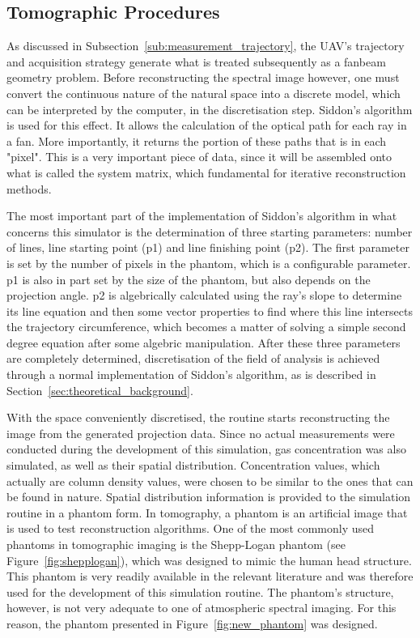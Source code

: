 \subsection{Tomographic Procedures}%
\label{sub:tomographic_procedures}

As discussed in Subsection~\ref{sub:measurement_trajectory}, the UAV's
trajectory and acquisition strategy generate what is treated
subsequently as a fanbeam geometry problem. Before reconstructing the
spectral image however, one must convert the continuous nature of the
natural space into a discrete model, which can be interpreted by the
computer, in the discretisation step. Siddon's algorithm is used for
this effect. It allows the calculation of the optical path for each ray
in a fan. More importantly, it returns the portion of these paths that
is in each "pixel". This is a very important piece of data, since it
will be assembled onto what is called the system matrix, which
fundamental for iterative reconstruction methods.

The most important part of the implementation of Siddon's algorithm in
what concerns this simulator is the determination of three starting
parameters: number of lines, line starting point (p1) and line finishing
point (p2). The first parameter is set by the number of pixels in the
phantom, which is a configurable parameter. p1 is also in part set by
the size of the phantom, but also depends on the projection angle. p2 is
algebrically calculated using the ray's slope to determine its line
equation and then some vector properties to find where this line
intersects the trajectory circumference, which becomes a matter of
solving a simple second degree equation after some algebric
manipulation. After these three parameters are completely determined,
discretisation of the field of analysis is achieved through a normal
implementation of Siddon's algorithm, as is described in
Section~\ref{sec:theoretical_background}.

With the space conveniently discretised, the routine starts
reconstructing the image from the generated projection data. Since no
actual measurements were conducted during the development of this
simulation, gas concentration was also simulated, as well as their
spatial distribution. Concentration values, which actually are column
density values, were chosen to be similar to the ones that can be found
in nature. Spatial distribution information is provided to the
simulation routine in a phantom form. In tomography, a phantom is an
artificial image that is used to test reconstruction algorithms. One of
the most commonly used phantoms in tomographic imaging is the
Shepp-Logan phantom (see Figure~\ref{fig:shepplogan}), which was
designed to mimic the human head structure. This phantom is very readily
available in the relevant literature and was therefore used for the
development of this simulation routine. The phantom's structure,
however, is not very adequate to one of atmospheric spectral imaging.
For this reason, the phantom presented in Figure~\ref{fig:new_phantom}
was designed.

